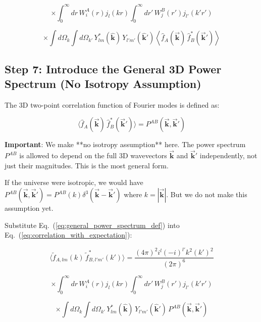 \begin{equation}
    \times \int_0^{\infty} dr \, W_i^A(r) j_{l}(kr) \int_0^{\infty} dr' \, W_j^B(r') j_{l'}(k'r')
\end{equation}

\begin{equation}
    \times \int d\Omega_k \int d\Omega_{k'} \, Y_{lm}^*(\hat{\mathbf{k}}) \, Y_{l'm'}(\hat{\mathbf{k}}') \left\langle \hat{f}_A(\vec{\mathbf{k}}) \, \hat{f}_B^*(\vec{\mathbf{k}}') \right\rangle
\label{eq:correlation_with_expectation}
\end{equation}

\subsection{Step 7: Introduce the General 3D Power Spectrum (No Isotropy Assumption)}

The 3D two-point correlation function of Fourier modes is defined as:

\begin{equation}
    \langle \hat{f}_A(\vec{\mathbf{k}}) \, \hat{f}_B^*(\vec{\mathbf{k}}') \rangle = P^{AB}(\vec{\mathbf{k}}, \vec{\mathbf{k}}')
\label{eq:general_power_spectrum_def}
\end{equation}

\textbf{Important}: We make **no isotropy assumption** here. The power spectrum $P^{AB}$ is allowed to depend on the full 3D wavevectors $\vec{\mathbf{k}}$ and $\vec{\mathbf{k}}'$ independently, not just their magnitudes. This is the most general form.

If the universe were isotropic, we would have $P^{AB}(\vec{\mathbf{k}}, \vec{\mathbf{k}}') = P^{AB}(k) \delta^3(\vec{\mathbf{k}} - \vec{\mathbf{k}}')$ where $k = |\vec{\mathbf{k}}|$. But we do not make this assumption yet.

Substitute Eq.~(\ref{eq:general_power_spectrum_def}) into Eq.~(\ref{eq:correlation_with_expectation}):

\begin{equation}
    \langle \tilde{f}_{A,lm}(k) \, \tilde{f}_{B,l'm'}^*(k') \rangle = \frac{(4\pi)^2 i^{l} (-i)^{l'} k^2 (k')^2}{(2\pi)^6}
\end{equation}

\begin{equation}
    \times \int_0^{\infty} dr \, W_i^A(r) j_{l}(kr) \int_0^{\infty} dr' \, W_j^B(r') j_{l'}(k'r')
\end{equation}

\begin{equation}
    \times \int d\Omega_k \int d\Omega_{k'} \, Y_{lm}^*(\hat{\mathbf{k}}) \, Y_{l'm'}(\hat{\mathbf{k}}') \, P^{AB}(\vec{\mathbf{k}}, \vec{\mathbf{k}}')
\label{eq:with_general_power}
\end{equation}


